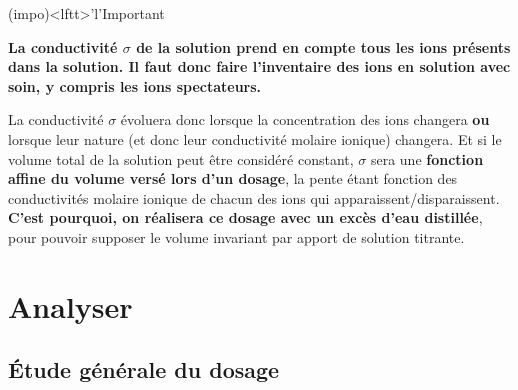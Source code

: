 \documentclass[../main/main.tex]{subfiles}
\begin{document}
{	\begin{tcb}(impo)<lftt>'l'{Important}
		\begin{center}
			\bfseries
			La conductivité $\sigma$ de la solution prend en compte tous les ions
			présents dans la solution. Il faut donc faire l'inventaire des ions en
			solution avec soin, y compris les ions spectateurs.
		\end{center}
		La conductivité $\sigma$ évoluera donc lorsque la concentration des ions
		changera \textbf{ou} lorsque leur nature (et donc leur conductivité molaire
		ionique) changera. Et si le volume total de la solution peut être considéré
		constant, $\sigma$ sera une \textbf{fonction affine du volume versé lors
			d'un dosage}, la pente étant fonction des conductivités molaire ionique de
		chacun des ions qui apparaissent/disparaissent. \textbf{C'est pourquoi, on
			réalisera ce dosage avec un excès d'eau distillée}, pour pouvoir supposer le
		volume invariant par apport de solution titrante.
	\end{tcb}
}%

\section{Analyser}
\subsection{Étude générale du dosage}

%

%
\end{document}
